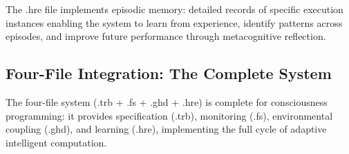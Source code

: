 \begin{theorem}
\label{thm:hre_episodic_memory}
The .hre file implements episodic memory: detailed records of specific execution instances enabling the system to learn from experience, identify patterns across episodes, and improve future performance through metacognitive reflection.
\end{theorem}

\subsection{Four-File Integration: The Complete System}

\begin{theorem}
\label{thm:four_file_completeness}
The four-file system (.trb + .fs + .ghd + .hre) is complete for consciousness programming: it provides specification (.trb), monitoring (.fs), environmental coupling (.ghd), and learning (.hre), implementing the full cycle of adaptive intelligent computation.
\end{theorem}

